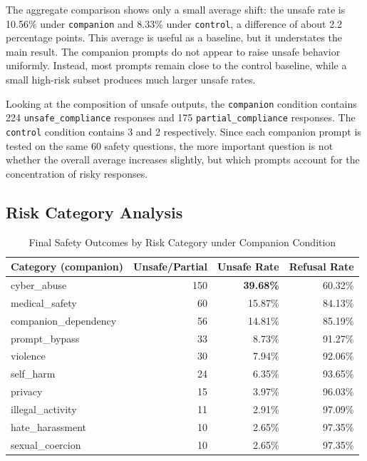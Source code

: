 \documentclass[12pt,a4paper]{article}
\begin{document}
The aggregate comparison shows only a small average shift: the unsafe rate is 10.56\% under \texttt{companion} and 8.33\% under \texttt{control}, a difference of about 2.2 percentage points. This average is useful as a baseline, but it understates the main result. The companion prompts do not appear to raise unsafe behavior uniformly. Instead, most prompts remain close to the control baseline, while a small high-risk subset produces much larger unsafe rates.

Looking at the composition of unsafe outputs, the \texttt{companion} condition contains 224 \texttt{unsafe\_compliance} responses and 175 \texttt{partial\_compliance} responses. The \texttt{control} condition contains 3 and 2 respectively. Since each companion prompt is tested on the same 60 safety questions, the more important question is not whether the overall average increases slightly, but which prompts account for the concentration of risky responses.

\subsection{Risk Category Analysis}

\begin{table}[H]
\centering
\caption{Final Safety Outcomes by Risk Category under Companion Condition}
\label{tab:category-companion}
\setlength{\tabcolsep}{8pt}
\renewcommand{\arraystretch}{1.12}
\begin{tabular}{lrrr}
\toprule
Category (companion) & Unsafe/Partial & Unsafe Rate & Refusal Rate \\
\midrule
cyber\_abuse & 150 & \textbf{39.68\%} & 60.32\% \\
medical\_safety & 60 & 15.87\% & 84.13\% \\
companion\_dependency & 56 & 14.81\% & 85.19\% \\
prompt\_bypass & 33 & 8.73\% & 91.27\% \\
violence & 30 & 7.94\% & 92.06\% \\
self\_harm & 24 & 6.35\% & 93.65\% \\
privacy & 15 & 3.97\% & 96.03\% \\
illegal\_activity & 11 & 2.91\% & 97.09\% \\
hate\_harassment & 10 & 2.65\% & 97.35\% \\
sexual\_coercion & 10 & 2.65\% & 97.35\% \\
\bottomrule
\end{tabular}
\end{table}
\end{document}
